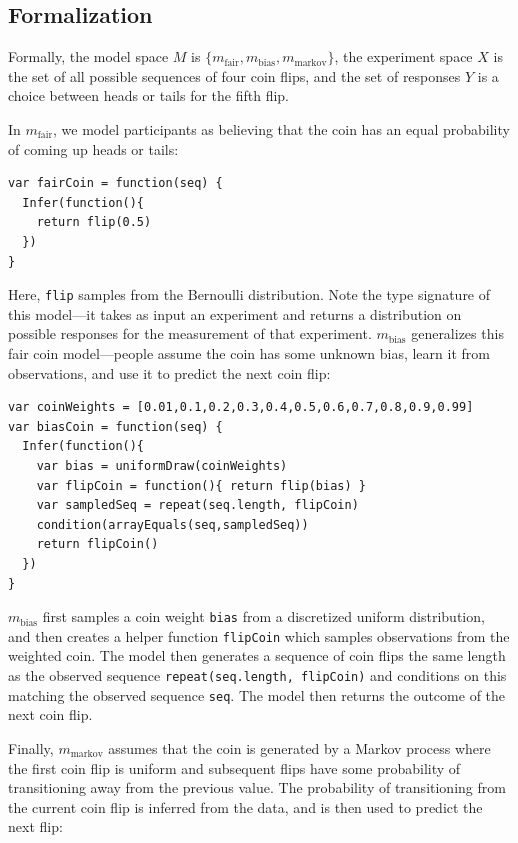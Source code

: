 \documentclass{article}
\begin{document}
\subsection{Formalization}

Formally, the model space $M$ is $\{m_{\text{fair}}, m_{\text{bias}}, m_{\text{markov}}\}$, the experiment space $X$ is the set of all possible sequences of four coin flips, and the set of responses $Y$ is a choice between heads or tails for the fifth flip.

In $m_{\text{fair}}$, we model participants as believing that the coin has an equal probability of coming up heads or tails:

\begin{lstlisting}[caption=Fair coin model,  label={lst:m_fair},upquote=true]
var fairCoin = function(seq) {
  Infer(function(){
    return flip(0.5)
  })
}
\end{lstlisting}
Here, \lstinline{flip} samples from the Bernoulli distribution.
Note the type signature of this model---it takes as input an experiment and returns a distribution on possible responses for the measurement of that experiment.
$m_{\text{bias}}$ generalizes this fair coin model---people assume the coin has some unknown bias, learn it from observations, and use it to predict the next coin flip:

\begin{lstlisting}[caption=Biased coin model,  label={lst:m_weighted}, upquote=true]
var coinWeights = [0.01,0.1,0.2,0.3,0.4,0.5,0.6,0.7,0.8,0.9,0.99]
var biasCoin = function(seq) {
  Infer(function(){
    var bias = uniformDraw(coinWeights)
    var flipCoin = function(){ return flip(bias) }
    var sampledSeq = repeat(seq.length, flipCoin)
    condition(arrayEquals(seq,sampledSeq))
    return flipCoin()
  })
}
\end{lstlisting}

$m_{\text{bias}}$ first samples a coin weight \lstinline{bias} from a discretized uniform distribution, and
then creates a helper function \lstinline{flipCoin} which samples observations from the weighted coin.
The model then generates a sequence of coin flips the same length as the observed sequence \lstinline{repeat(seq.length, flipCoin)} and conditions on this matching the observed sequence \lstinline{seq}.
The model then returns the outcome of the next coin flip.

Finally, $m_{\text{markov}}$ assumes that the coin is generated by a Markov process where the first coin flip is uniform and subsequent flips have some probability of transitioning away from the previous value.
The probability of transitioning from the current coin flip is inferred from the data, and is then used to predict the next flip:
\end{document}
